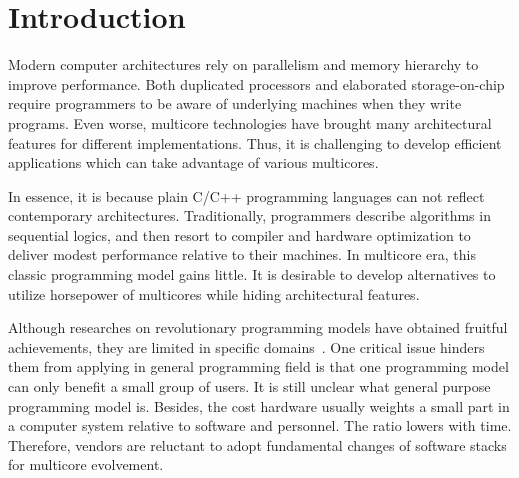 \section{Introduction}\label{sec:Intro}
Modern computer architectures rely on parallelism and memory
hierarchy to improve performance. Both duplicated processors and
elaborated storage-on-chip require programmers to be aware of underlying
machines when they write programs. Even worse,
multicore technologies have brought many architectural features for
different implementations. Thus, it is challenging to develop
efficient applications which can take advantage of various multicores.

In essence, it is because plain C/C++ programming languages
can not reflect contemporary architectures. Traditionally, programmers
describe algorithms in sequential logics, and then resort to  compiler
and hardware optimization to deliver modest performance relative to
their machines. In multicore era, this classic programming model gains
little. It is desirable to develop alternatives to utilize horsepower
of multicores while hiding architectural features.

Although researches on revolutionary programming models have obtained
fruitful achievements, they are limited in specific domains~\cite{gmapreduce}.
One critical issue hinders them from applying in general programming
field is that one programming model can only
benefit a small group of users. It is still unclear what
general purpose programming model is. Besides, the cost hardware usually weights
a small part in a computer system relative to software and
personnel. The ratio lowers with time. Therefore, vendors are
reluctant to adopt fundamental changes of software stacks for
multicore evolvement.


